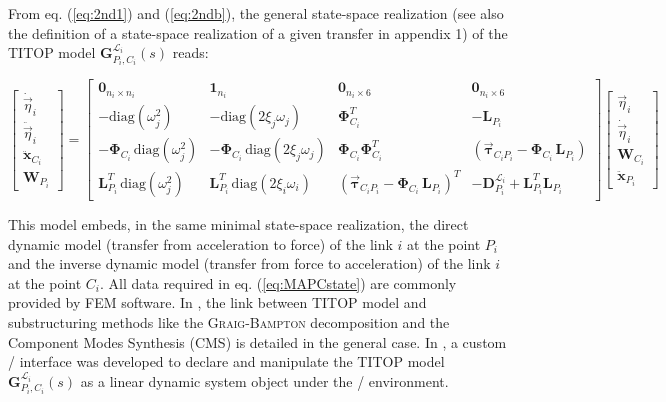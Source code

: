 From eq. (\ref{eq:2nd1}) and (\ref{eq:2ndb}), the general state-space realization (see also the definition of a state-space realization of a given transfer in appendix 1) of the TITOP model $\mathbf{G}_{P_i,C_i}^{\mathcal{L}_i}(s)$  reads:

\begin{scriptsize}
\begin{equation}\label{eq:MAPCstate}
\left[ \begin {array}{c} \dot{\vec{\eta}}_i \\ \ddot{\vec{\eta}}_i \\ \hline
\ddot{\mathbf{x}}_{C_i} \\ \mathbf{W}_{P_i}
\end{array} \right] = \left[ \begin {array}{cc|cc} \mathbf{0}_{n_i \times n_i}& \mathbf{1}_{n_i}
& \mathbf{0}_{n_i \times 6} & \mathbf{0}_{n_i \times 6}\\-\mbox{diag}(\omega_j^2) & -\mbox{diag}(2\xi_j\omega_j) & \mathbf{\Phi}_{C_i}^T & -\mathbf{L}_{P_i}\\ \hline
-\mathbf{\Phi}_{C_i}\,\mbox{diag}(\omega_j^2) & -\mathbf{\Phi}_{C_i}\,\mbox{diag}(2\xi_j\omega_j) &
\mathbf{\Phi}_{C_i}\mathbf{\Phi}_{C_i}^T & \left(\mathbf{\vec{\tau}}_{C_iP_i}-\mathbf{\Phi}_{C_i}\,\mathbf{L}_{P_i}\right)\\
\mathbf{L}^T_{P_i}\,\mbox{diag}(\omega_j^2) & \mathbf{L}^T_{P_i}\,\mbox{diag}(2\xi_i\omega_i) &
\left(\mathbf{\vec{\tau}}_{C_iP_i}-\mathbf{\Phi}_{C_i}\,\mathbf{L}_{P_i}\right)^T & -\mathbf{D}^{\mathcal{L}_i}_{P_i}+\mathbf{L}_{P_i}^T\mathbf{L}_{P_i}
\end{array}\right]  
\left[ \begin {array}{c} \vec{\eta}_i \\ \dot{\vec{\eta}}_i \\ \hline \mathbf{W}_{C_i} \\ \ddot{\mathbf{x}}_{P_i}
\end{array} \right]
\end{equation}
\end{scriptsize}


This model embeds, in the same minimal state-space realization, the direct dynamic model (transfer from acceleration to force) of the link $i$ at the point $P_i$ and the inverse dynamic model (transfer from force to acceleration) of the link $i$ at the point $C_i$.  All data required in eq. (\ref{eq:MAPCstate}) are commonly provided by FEM software. In \cite{Perez2015_LM}, the link between TITOP model and substructuring methods like the \textsc{Graig-Bampton} decomposition and the Component Modes Synthesis (CMS) is detailed in the general case. In \cite{Murali2015}, a custom \nastran / \simulink interface was developed to declare and manipulate the TITOP model $\mathbf{G}_{P_i,C_i}^{\mathcal{L}_i}(s)$ as a linear dynamic system object under the \matlab / \simulink environment.
 
